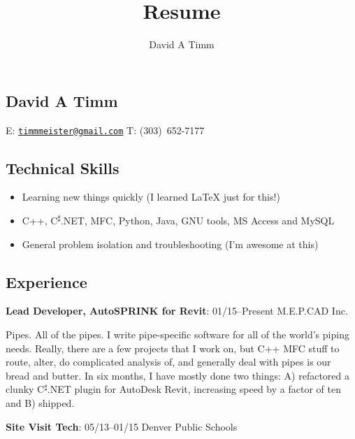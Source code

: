 \documentclass[letterpaper,12pt]{article}
\author{David A Timm}
\title{Resume}
\begin{document}
\begin{center}
\section{David A Timm}

E: \href{mailto:timmmeister@gmail.com?subject=You%27re%20hired!}
{\nolinkurl{timmmeister@gmail.com}}
T: \mbox{(303) 652-7177}
\end{center}

\begin{center}
\subsection{Technical Skills}
\end{center}

\begin{itemize}
\item Learning new things quickly (I learned \LaTeX{} just for this!)
\item C++, C\textsuperscript{{$\sharp$}}.NET, MFC, Python, Java, GNU tools, MS Access and MySQL
\item General problem isolation and troubleshooting (I'm awesome at this)
\end{itemize}

\begin{center}
\subsection{Experience}
\end{center}

\begin{flushleft}
\textbf{Lead Developer, AutoSPRINK for Revit}: 01/15--Present M.E.P.CAD Inc.
\end{flushleft}

Pipes. All of the pipes. I write pipe-specific software for all of the world's
piping needs. Really, there are a few projects that I work on, but C++ MFC
stuff to route, alter, do complicated analysis of, and generally deal with
pipes is our bread and butter. In six months, I have mostly done two things:
A) refactored a clunky C\textsuperscript{{$\sharp$}}.NET plugin for AutoDesk Revit,
increasing speed by a factor of ten and B) shipped.

\begin{flushleft}
\textbf{Site Visit Tech}: 05/13--01/15 Denver Public Schools
\end{flushleft}
\end{document}
